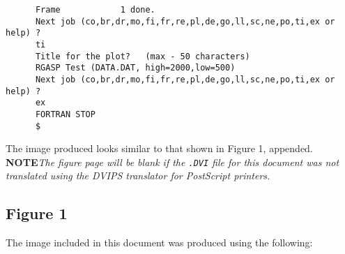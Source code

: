 \begin{verbatim}
      Frame            1 done.                                              
      Next job (co,br,dr,mo,fi,fr,re,pl,de,go,ll,sc,ne,po,ti,ex or help) ?  
      ti                                                                    
      Title for the plot?   (max - 50 characters)                           
      RGASP Test (DATA.DAT, high=2000,low=500)                              
      Next job (co,br,dr,mo,fi,fr,re,pl,de,go,ll,sc,ne,po,ti,ex or help) ?  
      ex                                                                    
      FORTRAN STOP
      $
\end{verbatim}
The image produced looks similar to that shown in Figure 1, appended.
{\bf NOTE}{\it The figure page will be blank if the {\tt .DVI} file for this
document was not translated using the DVIPS translator for PostScript
printers.}

\pagebreak
\subsection{Figure 1}

The image included in this document was produced using the following:

